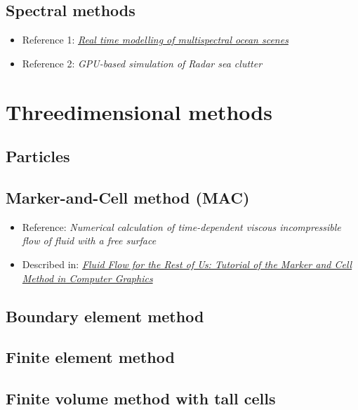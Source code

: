 \documentclass[]{report}
\begin{document}
\subsection{Spectral methods}

\begin{itemize}
    \item Reference 1: \textit{\href{http://web1.see.asso.fr/ocoss2010/Session_4/20100531111216_Monnier_OCOSS2010-Paper_MERCUDA_item_2.pdf}{Real time modelling of multispectral ocean scenes}}
    \item Reference 2: \textit{GPU-based simulation of Radar sea clutter}
\end{itemize}

\section{Threedimensional methods}

\subsection{Particles}

\subsection{Marker-and-Cell method (MAC)}

\begin{itemize}
    \item Reference: \textit{Numerical calculation of time-dependent viscous incompressible flow of fluid with a free surface}
    \item Described in: \textit{\href{http://people.sc.fsu.edu/~jburkardt/pdf/fluid_flow_for_the_rest_of_us.pdf}{Fluid Flow for the Rest of Us: Tutorial of the Marker and Cell Method in Computer Graphics}}
\end{itemize}

\subsection{Boundary element method}

\subsection{Finite element method}

\subsection{Finite volume method with tall cells}
\end{document}

